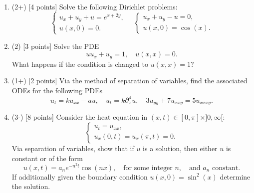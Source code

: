 \documentclass[12pt]{article}
\begin{document}
\begin{enumerate}
   \item (2+) [4 points] Solve the following Dirichlet problems:
         \[
            \begin{cases}
               u_x+u_y+u=e^{x+2y}, \\
               u(x,0)=0.
            \end{cases}\quad
            \begin{cases}
               u_x+u_y-u=0, \\
               u(x,0)=\cos(x).
            \end{cases}
         \]

   \item (2) [3 points] Solve the PDE
         \[
            uu_x+u_y=1,\quad u(x,x)=0.
         \]
         What happens if the condition is changed to \(u(x,x)=1\)?

   \item (1+) [2 points] Via the method of separation of variables, find the associated ODEs for the following PDEs
         \[
            u_t=ku_{xx}-au,\quad u_t=k\partial_x^{4}u,\quad 3u_{yy}+7u_{xxy}=5u_{xxxy}.
         \]

   \item (3-) [8 points] Consider the heat equation in \((x,t)\in [0,\pi]\times]0,\infty[\):
         \[
            \begin{cases}
               u_t=u_{xx}, \\
               u_x(0,t)=u_x(\pi,t)=0.
            \end{cases}
         \]
         Via separation of variables, show that if \(u\) is a solution, then either \(u\) is constant or of the form
         \[
            u(x,t)=a_ne^{-n^2t}\cos(nx),\quad\text{for some integer }n,\quad\text{and }a_n\text{ constant}.
         \]
         If additionally given the boundary condition \(u(x,0)=\sin^2(x)\) determine the solution.
\end{enumerate}
\end{document}

